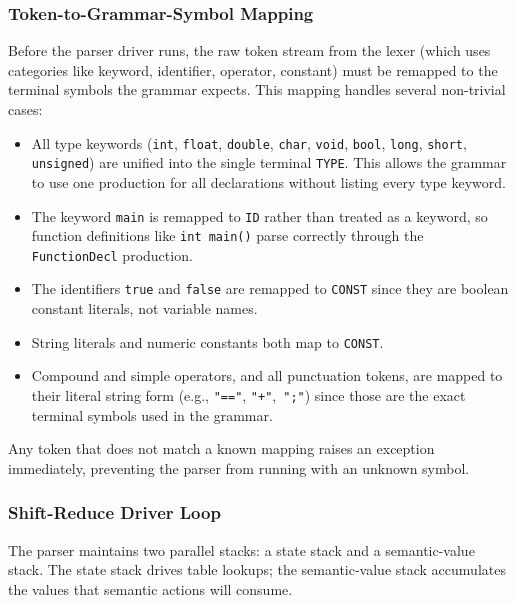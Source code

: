 \documentclass[letterpaper,12pt,oneside]{article}
\begin{document}
\subsubsection{Token-to-Grammar-Symbol Mapping}
Before the parser driver runs, the raw token stream from the lexer (which uses categories like keyword, identifier, operator, constant) must be remapped to the terminal symbols the grammar expects. This mapping handles several non-trivial cases:
\begin{itemize}
    \item All type keywords (\texttt{int}, \texttt{float}, \texttt{double}, \texttt{char}, \texttt{void}, \texttt{bool}, \texttt{long}, \texttt{short}, \texttt{unsigned}) are unified into the single terminal \texttt{TYPE}. This allows the grammar to use one production for all declarations without listing every type keyword.
    \item The keyword \texttt{main} is remapped to \texttt{ID} rather than treated as a keyword, so function definitions like \texttt{int main()} parse correctly through the \texttt{FunctionDecl} production.
    \item The identifiers \texttt{true} and \texttt{false} are remapped to \texttt{CONST} since they are boolean constant literals, not variable names.
    \item String literals and numeric constants both map to \texttt{CONST}.
    \item Compound and simple operators, and all punctuation tokens, are mapped to their literal string form (e.g., \texttt{"=="}, \texttt{"+"},\ \texttt{";"}) since those are the exact terminal symbols used in the grammar.
\end{itemize}
Any token that does not match a known mapping raises an exception immediately, preventing the parser from running with an unknown symbol.

\subsubsection{Shift-Reduce Driver Loop}
The parser maintains two parallel stacks: a state stack and a semantic-value stack. The state stack drives table lookups; the semantic-value stack accumulates the values that semantic actions will consume.
\end{document}
